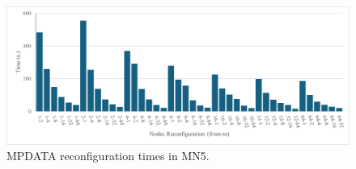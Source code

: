 \documentclass[a4paper,fleqn]{cas-dc}
\begin{document}
\begin{figure}[tbp]
    \centering
    \includegraphics[clip,width=\linewidth,trim={0.5cm 0.25cm 0.1cm 0.2cm}]{figures/mpdata-reconf.png}
    \caption{MPDATA reconfiguration times in MN5.}
    \label{fig:mpdata-reconf}
\end{figure}
\end{document}
